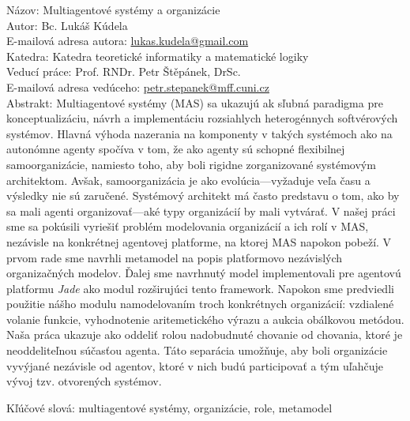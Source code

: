 
\frenchspacing

Názov: Multiagentové systémy a organizácie\\
Autor: Bc. Lukáš Kúdela\\
E-mailová adresa autora: \url{lukas.kudela@gmail.com}\\
Katedra: Katedra teoretické informatiky a matematické logiky\\
Veducí práce: Prof. RNDr. Petr Štěpánek, DrSc.\\
E-mailová adresa vedúceho: \url{petr.stepanek@mff.cuni.cz}\\

Abstrakt: Multiagentové systémy (MAS) sa ukazujú ak sľubná paradigma pre konceptualizáciu, návrh a implementáciu rozsiahlych heterogénnych softvérových systémov.
Hlavná výhoda nazerania na komponenty v takých systémoch ako na autonómne agenty spočíva v tom, že ako agenty sú schopné flexibilnej samoorganizácie, namiesto toho, aby boli rigidne zorganizované systémovým architektom.
Avšak, samoorganizácia je ako evolúcia---vyžaduje veľa času a výsledky nie sú zaručené.
Systémový architekt má často predstavu o tom, ako by sa mali agenti organizovať---aké typy organizácií by mali vytvárať.
V našej práci sme sa pokúsili vyriešiť problém modelovania organizácií a ich rolí v MAS, nezávisle na konkrétnej agentovej platforme, na ktorej MAS napokon pobeží.
V prvom rade sme navrhli metamodel na popis platformovo nezávislých organizačných modelov.
Ďalej sme navrhnutý model implementovali pre agentovú platformu \textit{Jade} ako modul rozširujúci tento framework.
Napokon sme predviedli použitie nášho modulu namodelovaním troch konkrétnych organizácií: vzdialené volanie funkcie, vyhodnotenie aritemetického výrazu a aukcia obálkovou metódou. 
Naša práca ukazuje ako oddeliť rolou nadobudnuté chovanie od chovania, ktoré je neoddeliteľnou súčasťou agenta.
Táto separácia umožňuje, aby boli organizácie vyvýjané nezávisle od agentov, ktoré v nich budú participovať a tým uľahčuje vývoj tzv. otvorených systémov.

Kľúčové slová: multiagentové systémy, organizácie, role, metamodel

\nonfrenchspacing